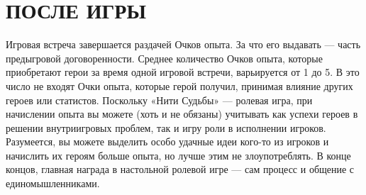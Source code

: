\section{ПОСЛЕ ИГРЫ}
Игровая встреча завершается раздачей Очков опыта. За что его выдавать — часть предыгровой договоренности. Среднее количество Очков опыта, которые приобретают герои за время одной игровой встречи, варьируется от 1 до 5. В это число не входят Очки опыта, которые герой получил, принимая влияние других героев или статистов.
\newline
Поскольку «Нити Судьбы» — ролевая игра, при начислении опыта вы можете (хоть и не обязаны) учитывать как успехи героев в решении внутриигровых проблем, так и игру роли в исполнении игроков.
\newline
Разумеется, вы можете выделить особо удачные идеи кого-то из игроков и начислить их героям больше опыта, но лучше этим не злоупотреблять. В конце концов, главная награда в настольной ролевой игре — сам процесс и общение с единомышленниками.